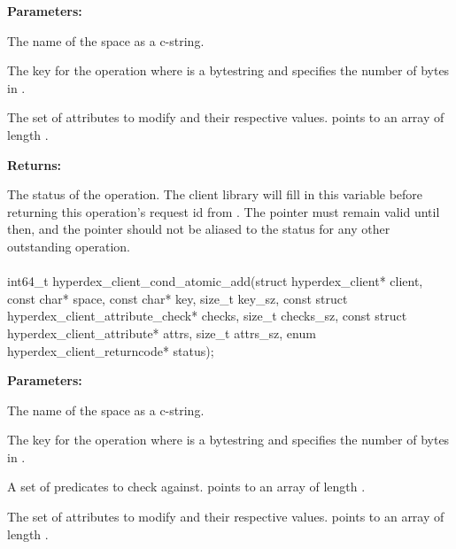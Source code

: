 \noindent\textbf{Parameters:}
\begin{description}[labelindent=\widthof{{\code{attrs}, \code{attrs\_sz}}},leftmargin=*,noitemsep,nolistsep,align=right]
\item[\code{space}] The name of the space as a c-string.
\item[\code{key}, \code{key\_sz}] The key for the operation where  is a bytestring and  specifies the number of bytes in .
\item[\code{attrs}, \code{attrs\_sz}] The set of attributes to modify and their respective values.   points to an array of length .
\end{description}

\noindent\textbf{Returns:}
\begin{description}[labelindent=\widthof{{\code{status}}},leftmargin=*,noitemsep,nolistsep,align=right]
\item[\code{status}] The status of the operation.  The client library will fill in this variable before returning this operation's request id from .  The pointer must remain valid until then, and the pointer should not be aliased to the status for any other outstanding operation.
\end{description}

\paragraph{}
\label{api:c:cond_atomic_add}
\begin{ccode}
int64_t hyperdex_client_cond_atomic_add(struct hyperdex_client* client,
        const char* space,
        const char* key, size_t key_sz,
        const struct hyperdex_client_attribute_check* checks, size_t checks_sz,
        const struct hyperdex_client_attribute* attrs, size_t attrs_sz,
        enum hyperdex_client_returncode* status);
\end{ccode}
\funcdesc 

\noindent\textbf{Parameters:}
\begin{description}[labelindent=\widthof{{\code{checks}, \code{checks\_sz}}},leftmargin=*,noitemsep,nolistsep,align=right]
\item[\code{space}] The name of the space as a c-string.
\item[\code{key}, \code{key\_sz}] The key for the operation where  is a bytestring and  specifies the number of bytes in .
\item[\code{checks}, \code{checks\_sz}] A set of predicates to check against.   points to an array of length .
\item[\code{attrs}, \code{attrs\_sz}] The set of attributes to modify and their respective values.   points to an array of length .
\end{description}

